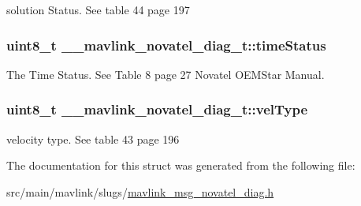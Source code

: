 solution Status. See table 44 page 197 

\hypertarget{struct____mavlink__novatel__diag__t_a43693f2ce0ac3c89b800d327c11bc37a}{
\subsubsection[{time\+Status}]{\setlength{\rightskip}{0pt plus 5cm}uint8\+\_\+t \+\_\+\+\_\+mavlink\+\_\+novatel\+\_\+diag\+\_\+t\+::time\+Status}}\label{struct____mavlink__novatel__diag__t_a43693f2ce0ac3c89b800d327c11bc37a}


The Time Status. See Table 8 page 27 Novatel O\+E\+M\+Star Manual. 

\hypertarget{struct____mavlink__novatel__diag__t_ae7186cff4ff8cf73fcff1872b18bad56}{
\subsubsection[{vel\+Type}]{\setlength{\rightskip}{0pt plus 5cm}uint8\+\_\+t \+\_\+\+\_\+mavlink\+\_\+novatel\+\_\+diag\+\_\+t\+::vel\+Type}}\label{struct____mavlink__novatel__diag__t_ae7186cff4ff8cf73fcff1872b18bad56}


velocity type. See table 43 page 196 



The documentation for this struct was generated from the following file\+:\begin{DoxyCompactItemize}
\item 
src/main/mavlink/slugs/\hyperlink{mavlink__msg__novatel__diag_8h}{mavlink\+\_\+msg\+\_\+novatel\+\_\+diag.\+h}\end{DoxyCompactItemize}
